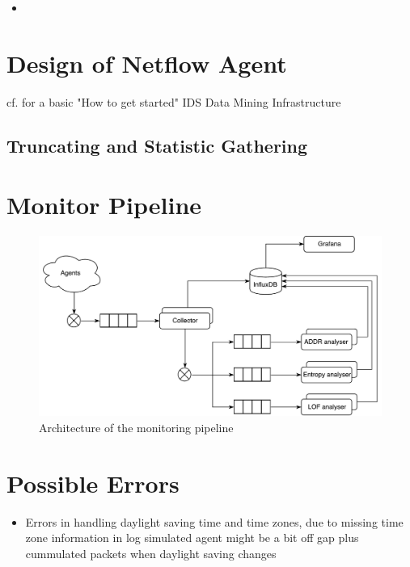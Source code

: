 
\begin{itemize}
	\item 
\end{itemize}

\section{Design of Netflow Agent}
	cf. \textcite{Bloedorn2001} for a basic "How to get started" IDS Data Mining Infrastructure
	\subsection{Truncating and Statistic Gathering}

\section{Monitor Pipeline}

\begin{figure}[h]
	\centering
	\includegraphics[width=\textwidth]{figures/300-concept-architecture.pdf}
	\caption[Pipeline Architecture]{Architecture of the monitoring pipeline}
	\label{fig:concept:architecture}
\end{figure}

\section{Possible Errors}
\begin{itemize}
	\item Errors in handling daylight saving time and time zones, due to missing time zone information in log
		\subitem simulated agent might be a bit off
		\subitem gap plus cummulated packets when daylight saving changes
\end{itemize}
